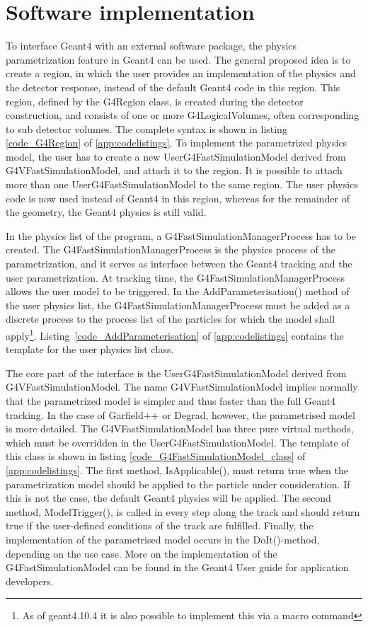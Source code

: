 \documentclass[preprint,12pt,sort&compress]{elsarticle}
\begin{document}
\section{Software implementation}

To interface Geant4 with an external software package, the physics para\-metrization feature in Geant4 can be used. The general proposed idea is to create a region, in which the user provides an implementation of the physics and the detector response, instead of the default Geant4 code in this region. This region, defined by the G4Region class, is created during the detector construction, and consists of one or more G4LogicalVolumes, often corresponding to sub detector volumes. The complete syntax is shown in listing \ref{code_G4Region} of \ref{app:codelistings}. To implement the parametrized physics model, the user has to create a new UserG4Fast\-Simulation\-Model derived from G4VFast\-Simulation\-Model, and attach it to the region. It is possible to attach more than one UserG4Fast\-Simulation\-Model to the same region. The user physics code is now used instead of Geant4 in this region, whereas for the remainder of the geometry, the Geant4 physics is still valid.

In the physics list of the program, a G4Fast\-Simulation\-Manager\-Process has to be created. The G4Fast\-Simulation\-Manager\-Process is the physics process of the parametrization, and it serves as interface between the Geant4 tracking and the user parametrization. At tracking time, the G4Fast\-Simulation\-Manager\-Process allows the user model to be triggered. In the AddParameterisation() method of the user physics list, the G4Fast\-Simulation\-Manager\-Process must be added as a discrete process to the process list of the particles for which the model shall apply\footnote{As of geant4.10.4 it is also possible to implement this via a macro command}. Listing~\ref{code_AddParameterisation} of \ref{app:codelistings} contains the template for the user physics list class.

The core part of the interface is the User\-G4Fast\-Simulation\-Model derived from G4VFast\-Simulation\-Model. The name G4VFast\-Simulation\-Model implies normally that the parametrized model is simpler and thus faster than the full Geant4 tracking. In the case of Garfield++ or Degrad, however, the parametrised model is more detailed. The G4VFast\-Simulation\-Model has three pure virtual methods, which must be overridden in the User\-G4Fast\-Simulation\-Model. The template of this class is shown in listing \ref{code_G4FastSimulationModel_class} of \ref{app:codelistings}. The first method, IsApplicable(), must return true when the parametrization model should be applied to the particle under consideration. If this is not the case, the default Geant4 physics will be applied. The second method, ModelTrigger(), is called in every step along the track and should return true if the user-defined conditions of the track are fulfilled. Finally, the implementation of the parametrised model occurs in the DoIt()-method, depending on the use case.  More on the implementation of the G4Fast\-Simulation\-Model can be found in the Geant4 User guide for application developers\cite{Geant4UserGuide}.
\end{document}
